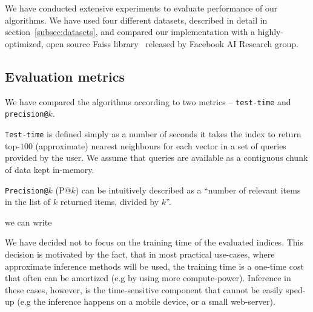 \section{}\label{sec:experimentalDesign}

    We have conducted extensive experiments to evaluate performance of our algorithms. We have used
    four different datasets, described in detail in section~\ref{subsec:datasets}, and compared
    our implementation with a highly-optimized, open source Faiss library~\cite{faiss} released by
    Facebook AI Research group.

    \subsection{Evaluation metrics}\label{subsec:evaluationMetrics}

        We have compared the algorithms according to two metrics -- \texttt{test-time}
        and \texttt{precision@}$k$.

        \texttt{Test-time} is defined simply as a number of seconds it takes the index to return
        top-$100$ (approximate) nearest neighbours for each vector in a set of queries provided by the user.
        We assume that queries are available as a contiguous chunk of data kept in-memory.

        \texttt{Precision@}$k$ (P@$k$) can be intuitively described as a
        ``number of relevant items in the list of $k$ returned items, divided by $k$''.

        we can write 

        We have decided not to focus on the training time of the evaluated indices. This
        decision is motivated by the fact, that in most practical use-cases, where
        approximate inference methods will be used, the training time is a one-time cost that
        often can be amortized (e.g by using more compute-power).
        Inference in these cases, however, is the time-sensitive component
        that cannot be easily sped-up (e.g the inference happens  on a mobile device, or a small web-server).

